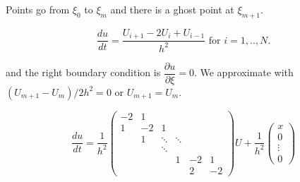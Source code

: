 Points go from $\xi_{0}$ to $\xi_m$ and there is a ghost point at $\xi_{m+1}$.

$$\dfrac{du}{dt}= \dfrac{U_{i+1}-2U_{i}+U_{i-1}}{h^2} \text{ for } i= 1, .., N.$$

and the right boundary condition is $\dfrac{\partial u}{\partial \xi}=0$. We approximate with $(U_{m+1}-U_{m})/2h^2 = 0$ or $U_{m+1}=U_{m}$.



$$\dfrac{du}{dt}= \dfrac{1}{h^2}
\begin{pmatrix}
-2  & 1 &        &         &  & \\
1 & -2 & 1 &         &  & \\
       & 1 & \ddots & \ddots  &  & \\
       &        & \ddots &         &   &    \\
	   &        &        & 1 & -2 & 1\\
	   &			&		&		  & 2 & -2
\end{pmatrix}U + \dfrac{1}{h^2}\begin{pmatrix}
x\\
0\\
\vdots \\
0
\end{pmatrix}$$

